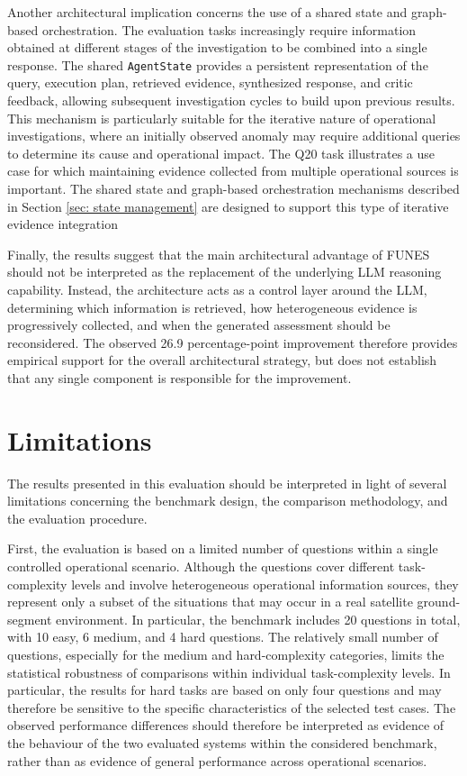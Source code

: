 Another architectural implication concerns the use of a shared state and graph-based orchestration. The evaluation tasks increasingly require information obtained at different stages of the investigation to be combined into a single response. The shared \texttt{AgentState} provides a persistent representation of the query, execution plan, retrieved evidence, synthesized response, and critic feedback, allowing subsequent investigation cycles to build upon previous results. This mechanism is particularly suitable for the iterative nature of operational investigations, where an initially observed anomaly may require additional queries to determine its cause and operational impact.
The Q20 task illustrates a use case for which maintaining evidence collected from multiple operational sources is important. The shared state and graph-based orchestration mechanisms described in Section \ref{sec: state management} are designed to support this type of iterative evidence integration

Finally, the results suggest that the main architectural advantage of FUNES should not be interpreted as the replacement of the underlying LLM reasoning capability. Instead, the architecture acts as a control layer around the LLM, determining which information is retrieved, how heterogeneous evidence is progressively collected, and when the generated assessment should be reconsidered. The observed 26.9 percentage-point improvement therefore provides empirical support for the overall architectural strategy, but does not establish that any single component is responsible for the improvement.




\section{Limitations}
\label{sec:evaluation limitations}

The results presented in this evaluation should be interpreted in light of several limitations concerning the benchmark design, the comparison methodology, and the evaluation procedure.

First, the evaluation is based on a limited number of questions within a single controlled operational scenario. Although the questions cover different task-complexity levels and involve heterogeneous operational information sources, they represent only a subset of the situations that may occur in a real satellite ground-segment environment. In particular, the benchmark includes 20 questions in total, with 10 easy, 6 medium, and 4 hard questions. The relatively small number of questions, especially for the medium and hard-complexity categories, limits the statistical robustness of comparisons within individual task-complexity levels. In particular, the results for hard tasks are based on only four questions and may therefore be sensitive to the specific characteristics of the selected test cases. The observed performance differences should therefore be interpreted as evidence of the behaviour of the two evaluated systems within the considered benchmark, rather than as evidence of general performance across operational scenarios.

